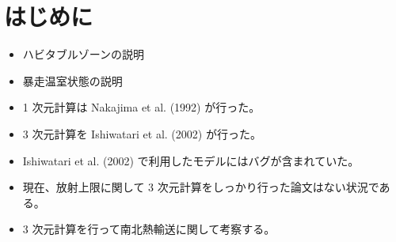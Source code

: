 \documentclass[body]{subfiles}
\begin{document}
\section{はじめに}
\begin{itemize}
	\item ハビタブルゾーンの説明
	\item 暴走温室状態の説明
	\item 1 次元計算は Nakajima et al. (1992) が行った。
	\item 3 次元計算を Ishiwatari et al. (2002) が行った。
	\item Ishiwatari et al. (2002) で利用したモデルにはバグが含まれていた。
	\item 現在、放射上限に関して 3 次元計算をしっかり行った論文はない状況である。
	\item 3 次元計算を行って南北熱輸送に関して考察する。
\end{itemize}
\end{document}
